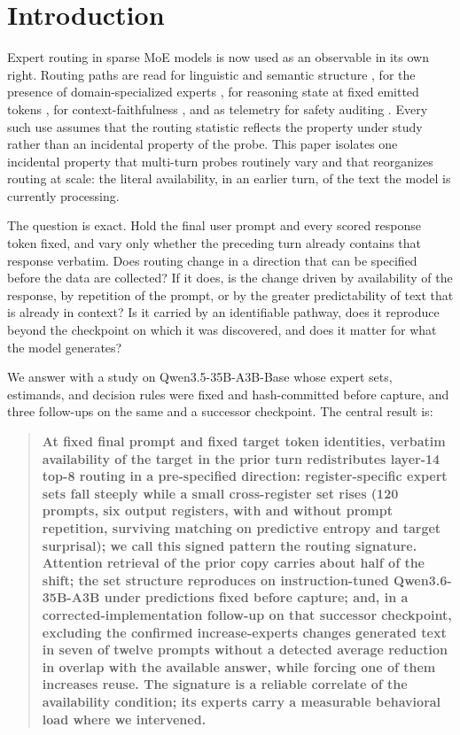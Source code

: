 \documentclass[10pt,a4paper,twocolumn]{article}
\begin{document}
\section{Introduction}

Expert routing in sparse MoE models is now used as an observable in its own
right. Routing paths are read for linguistic and semantic structure
\cite{antoine2025,olson2025}, for the presence of domain-specialized experts
\cite{wang2026dbes,wang2026}, for reasoning state at fixed emitted tokens
\cite{chen2026}, for context-faithfulness \cite{bai2025}, and as telemetry
for safety auditing \cite{lv2026}. Every such use assumes that the routing
statistic reflects the property under study rather than an incidental
property of the probe. This paper isolates one incidental property that
multi-turn probes routinely vary and that reorganizes routing at scale: the
literal availability, in an earlier turn, of the text the model is currently
processing.

The question is exact. Hold the final user prompt and every scored response
token fixed, and vary only whether the preceding turn already contains that
response verbatim. Does routing change in a direction that can be specified
before the data are collected? If it does, is the change driven by
availability of the response, by repetition of the prompt, or by the greater
predictability of text that is already in context? Is it carried by an
identifiable pathway, does it reproduce beyond the checkpoint on which it was
discovered, and does it matter for what the model generates?

We answer with a study on Qwen3.5-35B-A3B-Base whose expert sets, estimands,
and decision rules were fixed and hash-committed before capture, and three
follow-ups on the same and a successor checkpoint. The central result is:

\begin{quote}
\textbf{At fixed final prompt and fixed target token identities, verbatim
availability of the target in the prior turn redistributes layer-14 top-8
routing in a pre-specified direction: register-specific expert sets fall
steeply while a small cross-register set rises (120 prompts, six output
registers, with and without prompt repetition, surviving matching on
predictive entropy and target surprisal); we call this signed pattern the
routing signature. Attention retrieval of the prior
copy carries about half of the shift; the set structure reproduces on
instruction-tuned Qwen3.6-35B-A3B under predictions fixed before capture;
and, in a corrected-implementation follow-up on that successor checkpoint,
excluding the confirmed increase-experts changes generated text in seven of
twelve prompts without a detected average reduction in overlap with the
available answer, while
forcing one of them increases reuse. The signature is a reliable correlate
of the availability condition; its experts carry a measurable behavioral
load where we intervened.}
\end{quote}
\end{document}
